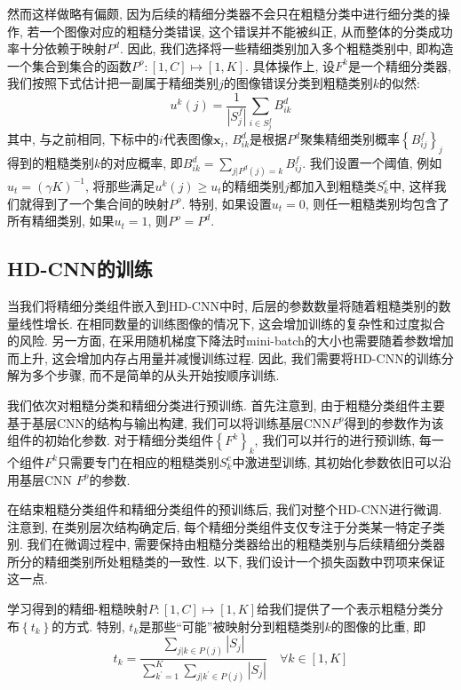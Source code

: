 \documentclass[lang=cn, 11pt,   a4paper]{elegantpaper}
\begin{document}
然而这样做略有偏颇, 因为后续的精细分类器不会只在粗糙分类中进行细分类的操作, 若一个图像对应的粗糙分类错误, 这个错误并不能被纠正, 从而整体的分类成功率十分依赖于映射$P^{d}$. 因此, 我们选择将一些精细类别加入多个粗糙类别中, 即构造一个集合到集合的函数$P^{o}: [1, C] \mapsto[1, K]$. 具体操作上, 设$F^k$是一个精细分类器, 我们按照下式估计把一副属于精细类别$j$的图像错误分类到粗糙类别$k$的似然: 
\begin{equation}
u^{k} (j)=\frac{1}{\left|S_{j}^{f}\right|} \sum_{i \in S_{j}^{f}} B_{i k}^{d}
\end{equation}
其中, 与之前相同, 下标中的$i$代表图像$\mathbf{x}_i$, $B_{i k}^{d}$是根据$P^d$聚集精细类别概率$\left\{B_{i j}^{f}\right\}_{j}$得到的粗糙类别$k$的对应概率, 即$B_{i k}^{d}=\sum_{j | P^{d} (j)=k} B_{i j}^{f}$. 我们设置一个阈值, 例如$u_{t}= (\gamma K)^{-1}$, 将那些满足$u^{k} (j) \geq u_{t}$的精细类别$j$都加入到粗糙类$S_{k}^{c}$中, 这样我们就得到了一个集合间的映射$P^o$. 特别, 如果设置$u_t = 0$, 则任一粗糙类别均包含了所有精细类别, 如果$u_t = 1$, 则$P^o = P^d$.

\subsection{HD-CNN的训练}
当我们将精细分类组件嵌入到HD-CNN中时, 后层的参数数量将随着粗糙类别的数量线性增长. 在相同数量的训练图像的情况下, 这会增加训练的复杂性和过度拟合的风险. 另一方面, 在采用随机梯度下降法时mini-batch的大小也需要随着参数增加而上升, 这会增加内存占用量并减慢训练过程. 因此, 我们需要将HD-CNN的训练分解为多个步骤, 而不是简单的从头开始按顺序训练.

我们依次对粗糙分类和精细分类进行预训练. 首先注意到, 由于粗糙分类组件主要基于基层CNN的结构与输出构建, 我们可以将训练基层CNN$F^{p}$得到的参数作为该组件的初始化参数. 对于精细分类组件$\left\{F^{k}\right\}_{k}$, 我们可以并行的进行预训练, 每一个组件$F^k$只需要专门在相应的粗糙类别$S_{k}^{c}$中激进型训练, 其初始化参数依旧可以沿用基层CNN $F^p$的参数.

在结束粗糙分类组件和精细分类组件的预训练后, 我们对整个HD-CNN进行微调. 注意到, 在类别层次结构确定后, 每个精细分类组件支仅专注于分类某一特定子类别. 我们在微调过程中, 需要保持由粗糙分类器给出的粗糙类别与后续精细分类器所分的精细类别所处粗糙类的一致性. 以下, 我们设计一个损失函数中罚项来保证这一点.

学习得到的精细-粗糙映射$P: [1, C] \mapsto[1, K]$给我们提供了一个表示粗糙分类分布$\left\{t_{k}\right\}$的方式. 特别, $t_{k}$是那些``可能''被映射分到粗糙类别$k$的图像的比重, 即
\begin{equation}
t_{k}=\frac{\sum_{j | k \in P (j)}\left|S_{j}\right|}{\sum_{k^{\prime}=1}^{K} \sum_{j | k^{\prime} \in P (j)}\left|S_{j}\right|} \quad \forall k \in[1, K]
\end{equation}
\end{document}
